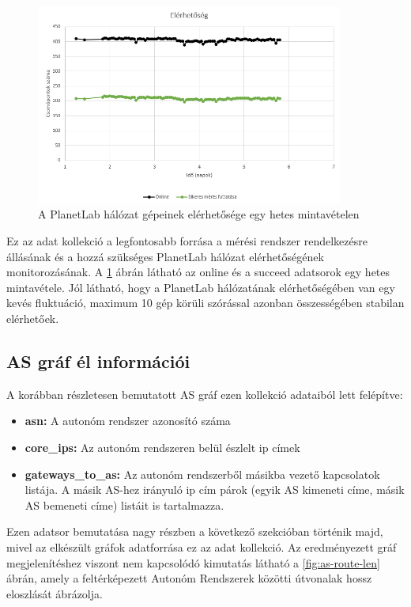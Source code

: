 \begin{figure}[!ht]
	\centering
	\includegraphics[width=0.9\textwidth, keepaspectratio]{figures/availability.PNG}
	\caption{A PlanetLab hálózat gépeinek elérhetősége egy hetes mintavételen}
	\label{fig:availability}
\end{figure}

Ez az adat kollekció a legfontosabb forrása a mérési rendszer rendelkezésre állásának és a hozzá szükséges PlanetLab hálózat elérhetőségének monitorozásának. A \ref{fig:availability} ábrán látható az online és a succeed adatsorok egy hetes mintavétele. Jól látható, hogy a PlanetLab hálózatának elérhetőségében van egy kevés fluktuáció, maximum 10 gép körüli szórással azonban összességében stabilan elérhetőek.



\subsection*{AS gráf él információi}
A korábban részletesen bemutatott AS gráf ezen kollekció adataiból lett felépítve:

\begin{itemize}
\item \textbf{asn:} A autonóm rendszer azonosító száma
\item \textbf{core\_ips:} Az autonóm rendszeren belül észlelt ip címek
\item \textbf{gateways\_to\_as:} Az autonóm rendszerből másikba vezető kapcsolatok listája. A másik AS-hez irányuló ip cím párok (egyik AS kimeneti címe, másik AS bemeneti címe) listáit is tartalmazza.
\end{itemize}

Ezen adatsor bemutatása nagy részben a következő szekcióban történik majd, mivel az elkészült gráfok adatforrása ez az adat kollekció. Az eredményezett gráf megjelenítéshez viszont nem kapcsolódó kimutatás látható a \ref{fig:as-route-len} ábrán, amely a feltérképezett Autonóm Rendszerek közötti útvonalak hossz eloszlását ábrázolja.

